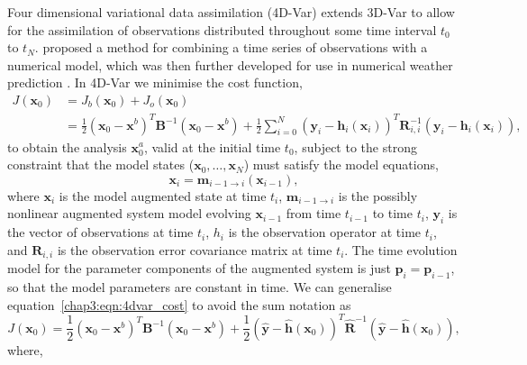 Four dimensional variational data assimilation (4D-Var) extends 3D-Var to allow for the assimilation of observations distributed throughout some time interval \(t_{0}\) to \(t_{N}\). \citet{Sasaki70somebasic} proposed a method for combining a time series of observations with a numerical model, which was then further developed for use in numerical weather prediction \citep{dimet1986variational}. In 4D-Var we minimise the cost function,
\begin{equation}
\begin{split}
J(\textbf{x}_0) &= J_b(\textbf{x}_0) + J_o(\textbf{x}_0) \\
&= \frac{1}{2}(\textbf{x}_0-\textbf{x}^b)^{T}\textbf{B}^{-1}(\textbf{x}_0-\textbf{x}^b)+\frac{1}{2}\sum_{i=0}^{N}(\textbf{y}_i-\textbf{h}_i(\textbf{x}_i))^{T}\textbf{R}_{i,i}^{-1}(\textbf{y}_i-\textbf{h}_i(\textbf{x}_i)), \label{chap3:eqn:4dvar_cost}
\end{split}
\end{equation}
to obtain the analysis \(\textbf{x}^{a}_{0}\), valid at the initial time \(t_{0}\), subject to the strong constraint that the model states (\(\textbf{x}_0, \dots, \textbf{x}_N\)) must satisfy the model equations,
\begin{equation}
\textbf{x}_{i} = \textbf{m}_{i-1 \rightarrow i}(\textbf{x}_{i-1}), \label{chap3:eqn:nonlinmod}
\end{equation}
where \(\textbf{x}_{i}\) is the model augmented state at time \(t_i\), \(\textbf{m}_{i-1 \rightarrow i}\) is the possibly nonlinear augmented system model evolving \(\textbf{x}_{i-1}\) from time \(t_{i-1}\) to time \(t_i\), \(\textbf{y}_i\) is the vector of observations at time \(t_i\), \(h_i\) is the observation operator at time \(t_i\), and \(\textbf{R}_{i,i}\) is the observation error covariance matrix at time \(t_i\). The time evolution model for the parameter components of the augmented system is just \(\textbf{p}_i = \textbf{p}_{i-1}\), so that the model parameters are constant in time. We can generalise equation~\eqref{chap3:eqn:4dvar_cost} to avoid the sum notation as
\begin{equation}
J(\textbf{x}_0) = \frac{1}{2}(\textbf{x}_0-\textbf{x}^b)^{T}\textbf{B}^{-1}(\textbf{x}_0-\textbf{x}^b)+\frac{1}{2}(\hat{\textbf{y}}-\hat{\textbf{h}}(\textbf{x}_0))^{T}\hat{\textbf{R}}^{-1}(\hat{\textbf{y}}-\hat{\textbf{h}}(\textbf{x}_0)), \label{chap3:costfn}
\end{equation}
where,

